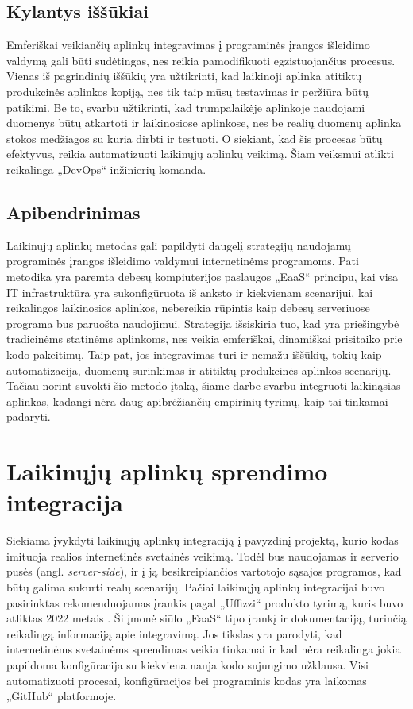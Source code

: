 \documentclass{VUMIFPSkursinis}
\begin{document}
\begin{itemize}
\end{itemize}

\subsection{Kylantys iššūkiai}

Emferiškai veikiančių aplinkų integravimas į programinės įrangos išleidimo valdymą gali būti sudėtingas, nes reikia pamodifikuoti egzistuojančius procesus. Vienas iš pagrindinių iššūkių yra užtikrinti, kad laikinoji aplinka atitiktų produkcinės aplinkos kopiją, nes tik taip mūsų testavimas ir peržiūra būtų patikimi. Be to, svarbu užtikrinti, kad trumpalaikėje aplinkoje naudojami duomenys būtų atkartoti ir laikinosiose aplinkose, nes be realių duomenų aplinka stokos medžiagos su kuria dirbti ir testuoti. O siekiant, kad šis procesas būtų efektyvus, reikia automatizuoti laikinųjų aplinkų veikimą. Šiam veiksmui atlikti reikalinga „DevOps“ inžinierių komanda.

\subsection{Apibendrinimas}

Laikinųjų aplinkų metodas gali papildyti daugelį strategijų naudojamų programinės įrangos išleidimo valdymui internetinėms programoms. Pati metodika yra paremta debesų kompiuterijos paslaugos „EaaS“ principu, kai visa IT infrastruktūra yra sukonfigūruota iš anksto ir kiekvienam scenarijui, kai reikalingos laikinosios aplinkos, nebereikia rūpintis kaip debesų serveriuose programa bus paruošta naudojimui. Strategija išsiskiria tuo, kad yra priešingybė tradicinėms statinėms aplinkoms, nes veikia emferiškai, dinamiškai prisitaiko prie kodo pakeitimų. Taip pat, jos integravimas turi ir nemažu iššūkių, tokių kaip automatizacija, duomenų surinkimas ir atitiktų produkcinės aplinkos scenarijų. Tačiau norint suvokti šio metodo įtaką, šiame darbe svarbu integruoti laikinąsias aplinkas, kadangi nėra daug apibrėžiančių empirinių tyrimų, kaip tai tinkamai padaryti.


\section{Laikinųjų aplinkų sprendimo integracija}

Siekiama įvykdyti laikinųjų aplinkų integraciją į pavyzdinį projektą, kurio kodas imituoja realios internetinės svetainės veikimą. Todėl bus naudojamas ir serverio pusės (angl. \textit{server-side}), ir į ją besikreipiančios vartotojo sąsajos programos, kad būtų galima sukurti realų scenarijų. Pačiai laikinųjų aplinkų integracijai buvo pasirinktas rekomenduojamas įrankis pagal „Uffizzi“ produkto tyrimą, kuris buvo atliktas 2022 metais \cite{SaltDvyliktas}. Ši įmonė siūlo „EaaS“ tipo įrankį ir dokumentaciją, turinčią reikalingą informaciją apie integravimą. Jos tikslas yra parodyti, kad internetinėms svetainėms sprendimas veikia tinkamai ir kad nėra reikalinga jokia papildoma konfigūracija su kiekviena nauja kodo sujungimo užklausa. Visi automatizuoti procesai, konfigūracijos bei programinis kodas yra laikomas „GitHub“ platformoje.
\end{document}
